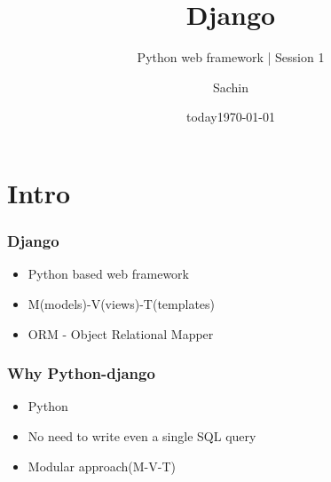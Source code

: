 \documentclass[bigger, presentation]{beamer}
\date{today}
\subtitle{Python web framework | Session 1}
\institute{Indian Institute of Technology Bombay}
\title{Django}
\author{Sachin}
\date{\today}
\begin{document}
\maketitle

\section{Intro}
\label{sec-1}
\begin{frame}
\frametitle{Django}
\label{sec-1-1}


\begin{itemize}
\item Python based web framework
\item M(models)-V(views)-T(templates)
\item ORM - Object Relational Mapper
\end{itemize}
\end{frame}
\begin{frame}
\frametitle{Why Python-django}
\label{sec-1-2}


\begin{itemize}
\item Python
\item No need to write even a single SQL query
\item Modular approach(M-V-T)
\end{itemize}
\end{frame}
\end{document}
